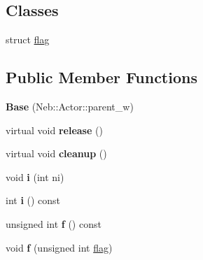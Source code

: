 \subsection*{\-Classes}
\begin{DoxyCompactItemize}
\item 
struct \hyperlink{structNeb_1_1Actor_1_1Base_1_1flag}{flag}
\end{DoxyCompactItemize}
\subsection*{\-Public \-Member \-Functions}
\begin{DoxyCompactItemize}
\item 
\hypertarget{classNeb_1_1Actor_1_1Base_ac45498cb0a5b4cfa704c7780a866cf0b}{{\bfseries \-Base} (\-Neb\-::\-Actor\-::parent\-\_\-w)}\label{classNeb_1_1Actor_1_1Base_ac45498cb0a5b4cfa704c7780a866cf0b}

\item 
\hypertarget{classNeb_1_1Actor_1_1Base_a19d7b3eeac560db781b8dd9d7a044bef}{virtual void {\bfseries release} ()}\label{classNeb_1_1Actor_1_1Base_a19d7b3eeac560db781b8dd9d7a044bef}

\item 
\hypertarget{classNeb_1_1Actor_1_1Base_a2368293ffeb3a2bee634a6b361171705}{virtual void {\bfseries cleanup} ()}\label{classNeb_1_1Actor_1_1Base_a2368293ffeb3a2bee634a6b361171705}

\item 
\hypertarget{classNeb_1_1Actor_1_1Base_a732e42c211856137d5fa55d041606805}{void {\bfseries i} (int ni)}\label{classNeb_1_1Actor_1_1Base_a732e42c211856137d5fa55d041606805}

\item 
\hypertarget{classNeb_1_1Actor_1_1Base_a8b8facad0502a876dec354116069fc00}{int {\bfseries i} () const }\label{classNeb_1_1Actor_1_1Base_a8b8facad0502a876dec354116069fc00}

\item 
\hypertarget{classNeb_1_1Actor_1_1Base_ab093290863fcedd9ef36828de4438401}{unsigned int {\bfseries f} () const }\label{classNeb_1_1Actor_1_1Base_ab093290863fcedd9ef36828de4438401}

\item 
\hypertarget{classNeb_1_1Actor_1_1Base_a400c04ba14166e7e399630c576f626eb}{void {\bfseries f} (unsigned int \hyperlink{structNeb_1_1Actor_1_1Base_1_1flag}{flag})}\label{classNeb_1_1Actor_1_1Base_a400c04ba14166e7e399630c576f626eb}


\end{DoxyCompactItemize}
